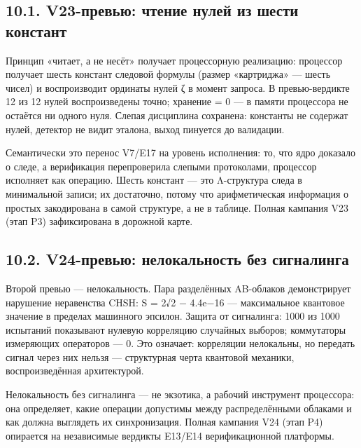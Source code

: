 \documentclass[11pt,a4paper]{article}
\begin{document}
\subsection{10.1. V23-превью: чтение нулей из шести констант}

Принцип «читает, а не несёт» получает процессорную реализацию: процессор получает шесть констант следовой формулы (размер «картриджа» — шесть чисел) и воспроизводит ординаты нулей ζ в момент запроса. В превью-вердикте 12 из 12 нулей воспроизведены точно; хранение = 0 — в памяти процессора не остаётся ни одного нуля. Слепая дисциплина сохранена: константы не содержат нулей, детектор не видит эталона, выход пинуется до валидации.

Семантически это перенос V7/E17 на уровень исполнения: то, что ядро доказало о следе, а верификация перепроверила слепыми протоколами, процессор исполняет как операцию. Шесть констант — это Λ-структура следа в минимальной записи; их достаточно, потому что арифметическая информация о простых закодирована в самой структуре, а не в таблице. Полная кампания V23 (этап P3) зафиксирована в дорожной карте.

\subsection{10.2. V24-превью: нелокальность без сигналинга}

Второй превью — нелокальность. Пара разделённых AB-облаков демонстрирует нарушение неравенства CHSH: S = 2√2 − 4.4e−16 — максимальное квантовое значение в пределах машинного эпсилон. Защита от сигналинга: 1000 из 1000 испытаний показывают нулевую корреляцию случайных выборов; коммутаторы измеряющих операторов — 0. Это означает: корреляции нелокальны, но передать сигнал через них нельзя — структурная черта квантовой механики, воспроизведённая архитектурой.

\begin{center}\end{center}

Нелокальность без сигналинга — не экзотика, а рабочий инструмент процессора: она определяет, какие операции допустимы между распределёнными облаками и как должна выглядеть их синхронизация. Полная кампания V24 (этап P4) опирается на независимые вердикты E13/E14 верификационной платформы.
\end{document}
